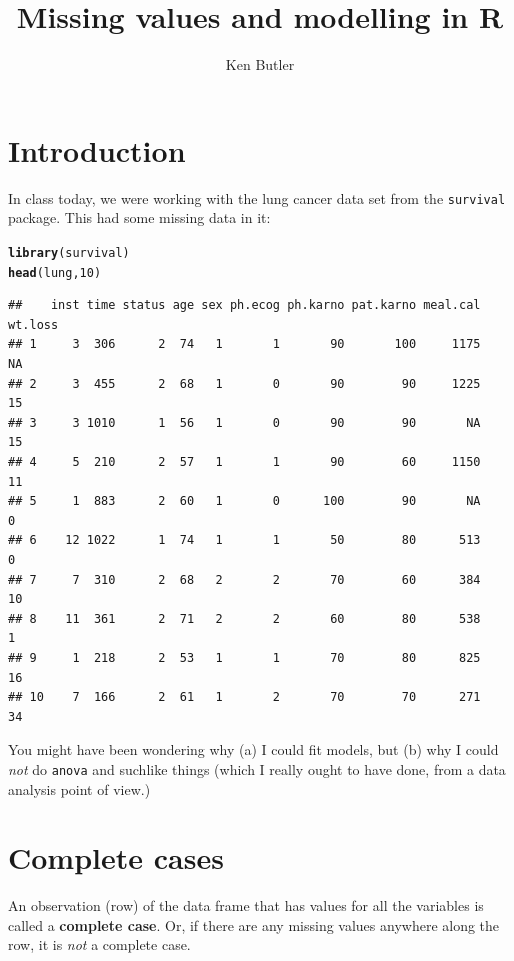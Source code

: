 \documentclass{article}\usepackage[]{graphicx}\usepackage[]{color}
\title{Missing values and modelling in R}
\author{Ken Butler}
\makeatletter
\newcommand{\hlnum}[1]{\textcolor[rgb]{0.686,0.059,0.569}{#1}}%
\newcommand{\hlstd}[1]{\textcolor[rgb]{0.345,0.345,0.345}{#1}}%
\newcommand{\hlkwd}[1]{\textcolor[rgb]{0.737,0.353,0.396}{\textbf{#1}}}%
\newenvironment{kframe}{%
 \def\at@end@of@kframe{}%
 \ifinner\ifhmode%
  \def\at@end@of@kframe{\end{minipage}}%
  \begin{minipage}{\columnwidth}%
 \fi\fi%
 \def\FrameCommand##1{\hskip\@totalleftmargin \hskip-\fboxsep
 \colorbox{shadecolor}{##1}\hskip-\fboxsep
     \hskip-\linewidth \hskip-\@totalleftmargin \hskip\columnwidth}%
 \MakeFramed {\advance\hsize-\width
   \@totalleftmargin\z@ \linewidth\hsize
   \@setminipage}}%
 {\par\unskip\endMakeFramed%
 \at@end@of@kframe}
\newenvironment{knitrout}{}{} %
\makeatother
\begin{document}
\maketitle

\section{Introduction}

In class today, we were working with the lung cancer data set from the
\texttt{survival} package. This had some missing data in it:

\begin{knitrout}
\color{fgcolor}\begin{kframe}
\begin{alltt}
\hlkwd{library}\hlstd{(survival)}
\hlkwd{head}\hlstd{(lung,}\hlnum{10}\hlstd{)}
\end{alltt}
\begin{verbatim}
##    inst time status age sex ph.ecog ph.karno pat.karno meal.cal wt.loss
## 1     3  306      2  74   1       1       90       100     1175      NA
## 2     3  455      2  68   1       0       90        90     1225      15
## 3     3 1010      1  56   1       0       90        90       NA      15
## 4     5  210      2  57   1       1       90        60     1150      11
## 5     1  883      2  60   1       0      100        90       NA       0
## 6    12 1022      1  74   1       1       50        80      513       0
## 7     7  310      2  68   2       2       70        60      384      10
## 8    11  361      2  71   2       2       60        80      538       1
## 9     1  218      2  53   1       1       70        80      825      16
## 10    7  166      2  61   1       2       70        70      271      34
\end{verbatim}
\end{kframe}
\end{knitrout}

You might have been wondering why (a) I could fit models, but (b) why
I could \emph{not} do \texttt{anova} and suchlike things (which I
really ought to have done, from a data analysis point of view.)

\section{Complete cases}

An observation (row) of the data frame that has values for all the variables
is called a \textbf{complete case}. Or, if there are any missing
values anywhere along the row, it is \emph{not} a complete case.
\end{document}
